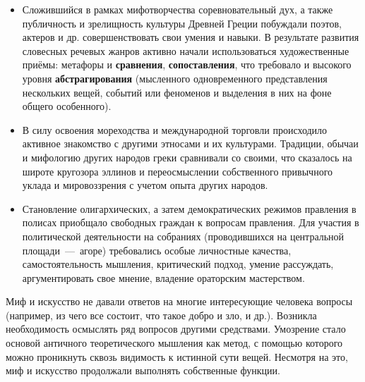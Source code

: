\begin{itemize}
    \item Сложившийся в рамках мифотворчества соревновательный дух, а также публичность и зрелищность культуры Древней Греции побуждали поэтов, актеров и др. совершенствовать свои умения и навыки. В результате развития словесных речевых жанров активно начали использоваться художественные приёмы: метафоры и \textbf{сравнения}, \textbf{сопоставления}, что требовало и высокого уровня \textbf{абстрагирования} (мысленного одновременного представления нескольких вещей, событий или феноменов и выделения в них на фоне общего особенного).
    \item В силу освоения мореходства и международной торговли происходило активное знакомство с другими этносами и их культурами. Традиции, обычаи и мифологию других народов греки сравнивали со своими, что сказалось на широте кругозора эллинов и переосмыслении собственного привычного уклада и мировоззрения с учетом опыта других народов.
    \item Становление олигархических, а затем демократических режимов правления в полисах приобщало свободных граждан к вопросам правления. Для участия в политической деятельности на собраниях (проводившихся на центральной площади~---~агоре) требовались особые личностные качества, самостоятельность мышления, критический подход, умение рассуждать, аргументировать свое мнение, владение ораторским мастерством.
\end{itemize}

Миф и искусство не давали ответов на многие интересующие человека вопросы (например, из чего все состоит, что такое добро и зло, и др.). Возникла необходимость осмыслять ряд вопросов другими средствами. Умозрение стало основой античного теоретического мышления как метод, с помощью которого можно проникнуть сквозь видимость к истинной сути вещей. Несмотря на это, миф и искусство продолжали выполнять собственные функции.  




